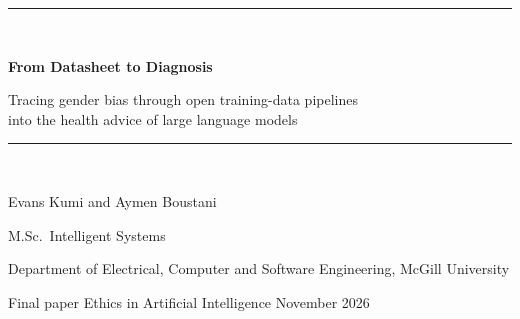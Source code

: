 \documentclass[11pt,twocolumn]{article}
\begin{document}
\begin{titlepage}
\centering
\vspace*{1.6cm}
{\color{darkred}\rule{\linewidth}{1.2pt}}\\[0.5cm]
{\LARGE\bfseries From Datasheet to Diagnosis\par}
\vspace{0.35cm}
{\Large Tracing gender bias through open training-data pipelines\\into the health advice of large language models\par}
\vspace{0.35cm}
{\color{darkred}\rule{\linewidth}{1.2pt}}\\[1.3cm]
{\large Evans Kumi \quad and \quad Aymen Boustani\par}
\vspace{0.3cm}
{\large M.Sc.\ Intelligent Systems\par}
\vspace{0.18cm}
{\large Department of Electrical, Computer and Software Engineering, McGill University\par}
\vspace{0.9cm}
{\large Final paper\;\textbullet\; Ethics in Artificial Intelligence\;\textbullet\; November 2026\par}


\end{titlepage}
\end{document}
